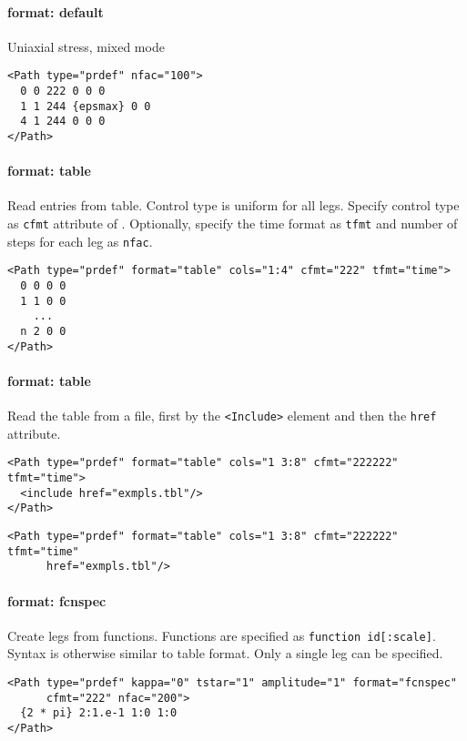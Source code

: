 \documentclass[11pt]{report}
\renewcommand{\tag}[1]{\texttt{<#1>}}
\newcommand{\reqdtag}[1]{\Red{\texttt{<#1>}}}
\begin{document}
\paragraph{format: default} Uniaxial stress, mixed mode
\begin{verbatim}
<Path type="prdef" nfac="100">
  0 0 222 0 0 0
  1 1 244 {epsmax} 0 0
  4 1 244 0 0 0
</Path>
\end{verbatim}

\paragraph{format: table} Read entries from table. Control type is uniform for
all legs. Specify control type as \texttt{cfmt} attribute of \reqdtag{Path}.
Optionally, specify the time format as \texttt{tfmt} and number of steps for
each leg as \texttt{nfac}.
\begin{verbatim}
<Path type="prdef" format="table" cols="1:4" cfmt="222" tfmt="time">
  0 0 0 0
  1 1 0 0
    ...
  n 2 0 0
</Path>
\end{verbatim}

\paragraph{format: table} Read the table from a file, first by the
\tag{Include} element and then the \texttt{href} attribute.
\begin{verbatim}
<Path type="prdef" format="table" cols="1 3:8" cfmt="222222" tfmt="time">
  <include href="exmpls.tbl"/>
</Path>
\end{verbatim}

\begin{verbatim}
<Path type="prdef" format="table" cols="1 3:8" cfmt="222222" tfmt="time"
      href="exmpls.tbl"/>
\end{verbatim}

\paragraph{format: fcnspec} Create legs from functions. Functions are specified
as \texttt{function id[:scale]}.  Syntax is otherwise similar to table format.
Only a single leg can be specified.
\begin{verbatim}
<Path type="prdef" kappa="0" tstar="1" amplitude="1" format="fcnspec"
      cfmt="222" nfac="200">
  {2 * pi} 2:1.e-1 1:0 1:0
</Path>
\end{verbatim}

\end{document}
